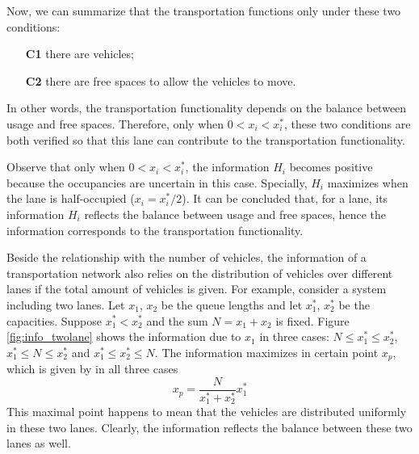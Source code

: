 \documentclass[preprint,authoryear,12pt]{elsarticle}
\begin{document}
Now, we can summarize that the transportation functions only under these two conditions:
\begin{enumerate}
  \item[\textbf{C1}] there are vehicles; \label{list:c1}
  \item[\textbf{C2}] there are free spaces to allow the vehicles to move. \label{list:c2}
\end{enumerate}
In other words, the transportation functionality depends on the balance between usage and free spaces. Therefore, only when $0<x_i<x_i^*$, these two conditions are both verified so that this lane can contribute to the transportation functionality.

Observe that only when $0<x_i<x_i^*$, the information $H_i$ becomes positive because the occupancies are uncertain in this case. Specially, $H_i$ maximizes when the lane is half-occupied ($x_i=x_i^*/2$). It can be concluded that, for a lane, its information $H_i$ reflects the balance between usage and free spaces, hence the information corresponds to the transportation functionality.

Beside the relationship with the number of vehicles, the information of a transportation network also relies on the distribution of vehicles over different lanes if the total amount of vehicles is given.
For example, consider a system including two lanes. Let $x_1$, $x_2$ be the queue lengths and let $x_1^*$, $x_2^*$ be the capacities. Suppose $x_1^*<x_2^*$ and the sum $N=x_1+x_2$ is fixed. Figure \ref{fig:info_twolane} shows the information due to $x_1$ in three cases: $N\le x^*_1\le x^*_2$, $x^*_1\le N\le x^*_2$ and $x^*_1\le x^*_2\le N$. The information maximizes in certain point $x_p$, which is given by in all three cases
$$x_p = \frac{N}{x_1^*+x_2^*} x_1^*$$
This maximal point happens to mean that the vehicles are distributed uniformly in these two lanes. Clearly, the information reflects the balance between these two lanes as well.
\end{document}
